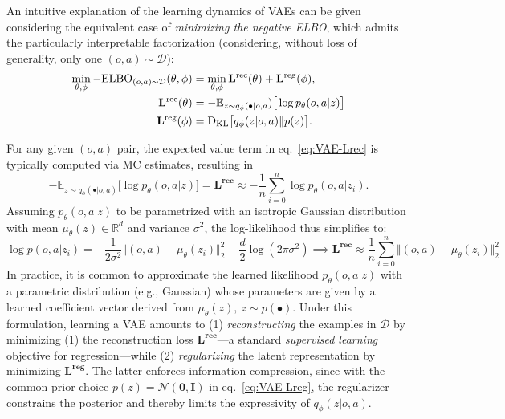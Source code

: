 An intuitive explanation of the learning dynamics of VAEs can be given considering the equivalent case of \emph{minimizing the negative ELBO}, which admits the particularly interpretable factorization (considering, without loss of generality, only one \( (o,a) \sim \mathcal D \)):
\begin{align}
\min_{\theta, \phi} - \text{ELBO}_{\mathcal (o,a) \sim \mathcal D}(\theta, \phi) &= \min_{\theta, \phi}\mathbf{L^{\text{rec}}}(\theta) + \mathbf{L^{\text{reg}}}(\phi), \label{eq:VAE-min-neg-ELBO}\\
\mathbf{L^{\text{rec}}}(\theta) &= - \mathbb{E}_{z \sim q_\phi(\bullet \vert o,a}) \big[ \log p_\theta(o,a \vert z) \big] \label{eq:VAE-Lrec} \\
\mathbf{L^{\text{reg}}}(\phi) &= \text{D}_{\text{KL}} \big[ q_\phi(z \vert o,a) \Vert p(z) \big]. \label{eq:VAE-Lreg}
\end{align}

For any given \((o,a) \) pair, the expected value term in eq.~\ref{eq:VAE-Lrec} is typically computed via MC estimates, resulting in
\[ 
-\mathbb{E}_{z \sim q_\phi(\bullet \vert o,a)} \big[ \log p_\theta(o,a \vert z) \big] = \mathbf{L^{\text{rec}}} \approx - \frac{1}{n} \sum_{i=0}^n \log p_\theta(o,a \vert z_i).
\]
Assuming \( p_\theta(o,a \vert z) \) to be parametrized with an isotropic Gaussian distribution with mean \(\mu_\theta (z) \in \mathbb R^d \) and variance \( \sigma^2 \), the log-likelihood thus simplifies to:
\[
\log p(o,a \vert z_i) = -\frac{1}{2\sigma^{2}} \big \Vert (o,a)-\mu_\theta(z_i) \big\Vert_2^2 -\frac{d}{2}\log(2\pi \sigma^{2}) \implies \mathbf{L^\text{rec}} \approx \frac {1}{n} \sum_{i=0}^n \big\Vert (o,a) - \mu_\theta(z_i) \big \Vert^2_2
\]
In practice, it is common to approximate the learned likelihood \( p_\theta(o,a \vert z) \) with a parametric distribution (e.g., Gaussian) whose parameters are given by a learned coefficient vector derived from \( \mu_\theta(z), \ z \sim p(\bullet) \). 
Under this formulation, learning a VAE amounts to (1) \emph{reconstructing} the examples in \( \mathcal{D} \) by minimizing (1) the reconstruction loss \( \mathbf{L^{\text{rec}}}\)---a standard \emph{supervised learning} objective for regression---while (2) \emph{regularizing} the latent representation by minimizing \( \mathbf{L^{\text{reg}}} \). 
The latter enforces information compression, since with the common prior choice \( p(z) = \mathcal{N}(\mathbf{0}, \mathbf{I})\) in eq.~\ref{eq:VAE-Lreg}, the regularizer constrains the posterior and thereby limits the expressivity of \( q_\phi(z \vert o,a) \).

